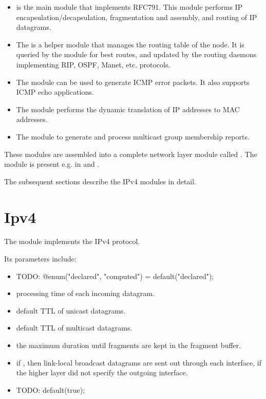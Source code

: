 \begin{itemize}
  \item {} is the main module that implements RFC791. This
        module performs IP encapsulation/decapsulation, fragmentation
        and assembly, and routing of IP datagrams.
  \item The  is a helper module that manages the routing
        table of the node. It is queried by the  module
        for best routes, and updated by the routing daemons implementing
        RIP, OSPF, Manet, etc. protocols.
  \item The  module can be used to generate ICMP error packets. It also
        supports ICMP echo applications.
  \item The  module performs the dynamic translation of IP addresses
        to MAC addresses.
  \item The  module to generate and process multicast group
        membership reports.
\end{itemize}

These modules are assembled into a complete network layer module called
. The  module is present
e.g. in  and .

The subsequent sections describe the IPv4 modules in detail.

\section{Ipv4}
\label{sec:ipv4:ipv4}

The  module implements the IPv4 protocol.

Its parameters include:

\begin{itemize}
  \item {} TODO: @enum("declared", "computed") = default("declared");
  \item {} processing time of each incoming datagram.
  \item {} default TTL of unicast datagrams.
  \item {} default TTL of multicast datagrams.
  \item {} the maximum duration until fragments are kept
          in the fragment buffer.
  \item {} if , then link-local broadcast
          datagrams are sent out through each interface, if the higher
          layer did not specify the outgoing interface.
  \item {} TODO: default(true);
\end{itemize}

